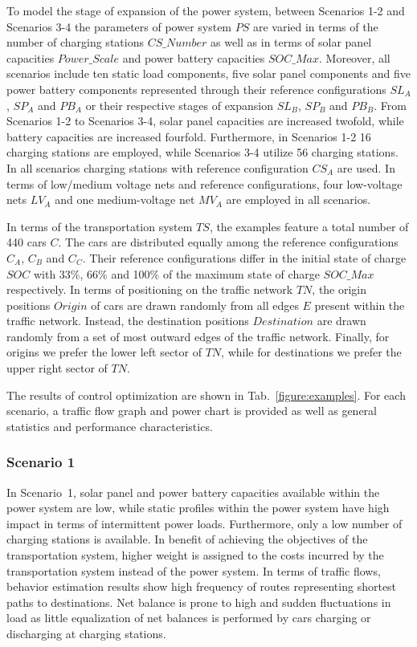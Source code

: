 To model the stage of expansion of the power system, between Scenarios 1-2 and Scenarios 3-4 the parameters of power system $PS$ are varied in terms of the number of charging stations $CS\_Number$ as well as in terms of solar panel capacities $Power\_Scale$ and power battery capacities $SOC\_Max$. Moreover, all scenarios include ten static load components, five solar panel components and five power battery components represented through their reference configurations $SL_{A}$, $SP_{A}$ and $PB_{A}$ or their respective stages of expansion $SL_{B}$, $SP_{B}$ and $PB_{B}$. From Scenarios 1-2 to Scenarios 3-4, solar panel capacities are increased twofold, while battery capacities are increased fourfold. Furthermore, in Scenarios 1-2 16 charging stations are employed, while Scenarios 3-4 utilize 56 charging stations. In all scenarios charging stations with reference configuration $CS_{A}$ are used. In terms of low/medium voltage nets and reference configurations, four low-voltage nets $LV_{A}$ and one medium-voltage net $MV_{A}$ are employed in all scenarios. 

In terms of the transportation system $TS$, the examples feature a total number of 440 cars $C$. The cars are distributed equally among the reference configurations $C_{A}$, $C_{B}$ and $C_{C}$. Their reference configurations differ in the initial state of charge $SOC$ with 33\%, 66\% and 100\% of the maximum state of charge $SOC\_Max$ respectively. In terms of positioning on the traffic network $TN$, the origin positions $Origin$ of cars are drawn randomly from all edges $E$ present within the traffic network. Instead, the destination positions $Destination$ are drawn randomly from a set of most outward edges of the traffic network. Finally, for origins we prefer the lower left sector of $TN$, while for destinations we prefer the upper right sector of $TN$.

The results of control optimization are shown in Tab.~\ref{figure:examples}. For each scenario, a traffic flow graph and power chart is provided as well as general statistics and performance characteristics.

\subsubsection*{Scenario 1}

In Scenario~1, solar panel and power battery capacities available within the power system are low, while static profiles within the power system have high impact in terms of intermittent power loads. Furthermore, only a low number of charging stations is available. In benefit of achieving the objectives of the transportation system, higher weight is assigned to the costs incurred by the transportation system instead of the power system. In terms of traffic flows, behavior estimation results show high frequency of routes representing shortest paths to destinations. Net balance is prone to high and sudden fluctuations in load as little equalization of net balances is performed by cars charging or discharging at charging stations.


